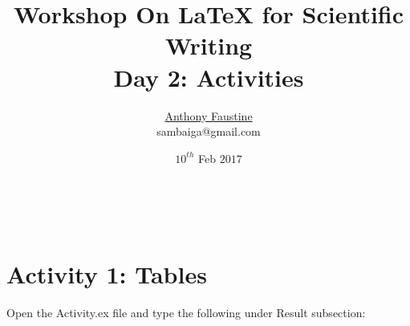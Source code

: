 \documentclass[a4paper,12pt]{article}
\title{{\Large \textbf{ {\color{green} \textbf{Workshop On LaTeX for Scientific Writing} } \\ Day 2: Activities}}}
\author{\href{sambaiga.github.io}{Anthony Faustine} \\sambaiga@gmail.com}
\date{$10^{th}$ Feb $2017$}
\begin{document}
	\maketitle
	
	
	
	\addtocounter{rom}{1}\setcounter{page}{2}~
	
	
	




\section*{{\color{green} Activity 1: Tables}}
Open the Activity.ex file and type the following under Result subsection:
\end{document}
